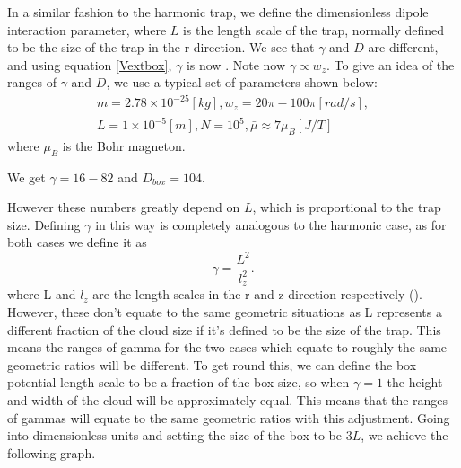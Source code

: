 \documentclass[10pt]{article}
\numberwithin{equation}{section}
\begin{document}
\begin{multicols}{2}
 In a similar fashion to the harmonic trap, we define the dimensionless dipole interaction parameter,  where $L$ is the length scale of the trap, normally defined to be the size of the trap in the r direction.
We see that $\gamma$ and $D$ are different, and using equation \eqref{Vextbox}, $\gamma$ is now . Note now $\gamma \propto w_z$. 
To give an idea of the ranges of $\gamma$ and $D$, we use a typical set of parameters shown below:
\begin{align*}
m=2.78\times10^{-25}[kg], w_z=20\pi-100\pi[rad/s], \\ L=1\times10^{-5}[m], N=10^5, \bar{\mu}\approx 7\mu_B [J/T]
\end{align*}
where $\mu_B$ is the Bohr magneton.

We get $\gamma = 16-82$ and $D_{box}=104$.

However these numbers greatly depend on $L$, which is proportional to the trap size. 
Defining $\gamma$ in this way is completely analogous to the harmonic case, as for both cases we define it as 
\begin{equation}
\gamma = \frac{L^{2}}{l_{z}^{2}}.
\end{equation}
where L and $l_{z}$ are the length scales in the r and z direction respectively (). However, these don't equate to the same geometric situations as L represents a different fraction of the cloud size if it's defined to be the size of the trap. This means  the ranges of gamma for the two cases which equate to roughly the same geometric ratios will be different. To get round this, we can define the box potential length scale to be a fraction of the box size, so when $\gamma =1$ the height and width of the cloud will be approximately equal. This means that the ranges of gammas will equate to the same geometric ratios with this adjustment. 
Going into dimensionless units and setting the size of the box to be $3L$, we achieve the following graph.


\end{multicols}
\end{document}
